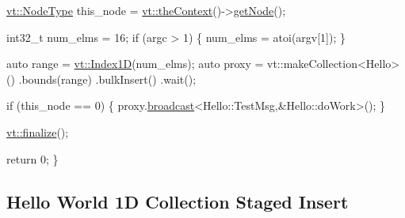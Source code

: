 \begin{DoxyCodeInclude}
  \hyperlink{namespacevt_a866da9d0efc19c0a1ce79e9e492f47e2}{vt::NodeType} this\_node = \hyperlink{namespacevt_a26551fe0e6e6a1371111df5b12c7e92c}{vt::theContext}()->\hyperlink{structvt_1_1ctx_1_1_context_a0d52c263ce8516546a67443d9a86fa5f}{getNode}();

  int32\_t num\_elms = 16;
  \textcolor{keywordflow}{if} (argc > 1) \{
    num\_elms = atoi(argv[1]);
  \}

  \textcolor{keyword}{auto} range = \hyperlink{namespacevt_a5540efc78234273e1796fb003fe4d234}{vt::Index1D}(num\_elms);
  \textcolor{keyword}{auto} proxy = vt::makeCollection<Hello>()
    .bounds(range)
    .bulkInsert()
    .wait();

  \textcolor{keywordflow}{if} (this\_node == 0) \{
    proxy.\hyperlink{structvt_1_1objgroup_1_1proxy_1_1_proxy_a0b716ca776b1f06e0d7d45afbe9e5274}{broadcast}<Hello::TestMsg,&Hello::doWork>();
  \}

  \hyperlink{namespacevt_a540d90dbd6e97b69f1dcbc9ee9314cff}{vt::finalize}();

  \textcolor{keywordflow}{return} 0;
\}
\end{DoxyCodeInclude}
 \hypertarget{collection_staged-insert-hello-world-collection}{}\subsection{Hello World 1\+D Collection Staged Insert}\label{collection_staged-insert-hello-world-collection}

